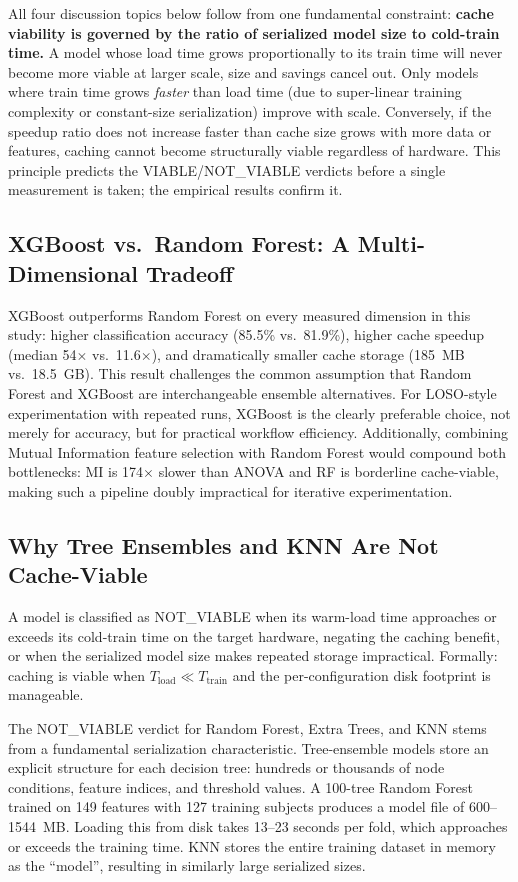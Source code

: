 All four discussion topics below follow from one fundamental constraint:
\textbf{cache viability is governed by the ratio of serialized model size to
cold-train time.} A model whose load time grows proportionally to its train
time will never become more viable at larger scale, size and savings cancel
out. Only models where train time grows \textit{faster} than load time (due to
super-linear training complexity or constant-size serialization) improve with
scale. Conversely, if the speedup ratio does not increase faster than cache
size grows with more data or features, caching cannot become structurally
viable regardless of hardware. This principle predicts the VIABLE/NOT\_VIABLE
verdicts before a single measurement is taken; the empirical results confirm it.

\subsection{XGBoost vs.\ Random Forest: A Multi-Dimensional Tradeoff}

XGBoost outperforms Random Forest on every measured dimension in this study:
higher classification accuracy (85.5\% vs.\ 81.9\%), higher cache speedup
(median 54$\times$ vs.\ 11.6$\times$), and dramatically smaller cache storage
(185~MB vs.\ 18.5~GB). This result challenges the common assumption that
Random Forest and XGBoost are interchangeable ensemble alternatives. For
LOSO-style experimentation with repeated runs, XGBoost is the clearly
preferable choice, not merely for accuracy, but for practical workflow efficiency.
Additionally, combining Mutual Information feature selection with Random Forest
would compound both bottlenecks: MI is 174$\times$ slower than ANOVA and RF is
borderline cache-viable, making such a pipeline doubly impractical for iterative
experimentation.

\subsection{Why Tree Ensembles and KNN Are Not Cache-Viable}

A model is classified as NOT\_VIABLE when its warm-load time approaches
or exceeds its cold-train time on the target hardware, negating the caching benefit,
or when the serialized model size makes repeated storage impractical.
Formally: caching is viable when $T_{\text{load}} \ll T_{\text{train}}$
and the per-configuration disk footprint is manageable.

The NOT\_VIABLE verdict for Random Forest, Extra Trees, and KNN stems from
a fundamental serialization characteristic. Tree-ensemble models store an
explicit structure for each decision tree: hundreds or thousands of node
conditions, feature indices, and threshold values. A 100-tree Random Forest
trained on 149 features with 127 training subjects produces a model file of
600--1544~MB. Loading this from disk takes 13--23 seconds per fold, which
approaches or exceeds the training time. KNN stores the entire training dataset
in memory as the ``model'', resulting in similarly large serialized sizes.

